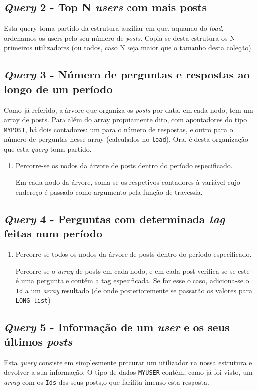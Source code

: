 \documentclass[10pt]{article}
\begin{document}
	\subsection*{\textit{Query} 2 - Top N \textit{users} com mais posts}
			Esta query toma partido da estrutura auziliar em que,
		aquando do \textit{load}, ordenamos os users pelo seu 
		número de \textit{posts}. Copia-se desta estrutura os 
		N primeiros utilizadores (ou todos, caso N seja maior
		que o tamanho desta coleção).			
	\subsection*{\textit{Query} 3 - Número de perguntas e respostas ao longo de um período}
			Como já referido, a árvore que organiza os \textit{posts} por data, em cada nodo,
		tem um array de posts. Para além do array propriamente dito, com apontadores do tipo
		\texttt{MYPOST}, há dois contadores: um para o número de respostas, e outro para o
		número de perguntas nesse array (calculados no \texttt{load}). Ora, é desta organização
		que esta \textit{query} toma partido.
		\begin{enumerate}
			\item Percorre-se os nodos da árvore de posts dentro do período especificado.
			
				Em cada nodo da árvore, soma-se os respetivos contadores à variável cujo 
			endereço é passado como argumento pela função de travessia.
		\end{enumerate}
	\subsection*{\textit{Query} 4 - Perguntas com determinada \textit{tag} feitas num período}
		\begin{enumerate}
			\item Percorre-se todos os nodos da árvore de posts dentro do período especificado.

				Percorre-se o \textit{array} de posts em cada nodo, e em cada post verifica-se
			se este é uma pergunta e contém a tag especificada. Se for esse o caso, adiciona-se
			o \texttt{Id} a um \textit{array} resultado (de onde posterioremente se passarão
			os valores para \texttt{LONG\_list})

		\end{enumerate}
			
	\subsection*{\textit{Query} 5 - Informação de um \textit{user} e os seus últimos \textit{posts}}
			Esta \textit{query} consiste em simplesmente procurar um utilizador na nossa estrutura
		e devolver a sua informação.			
			O tipo de dados \texttt{MYUSER} contém, como já foi visto, um \textit{array} com
		os \texttt{Ids} dos seus posts,o que facilita imenso esta resposta.
\end{document}
